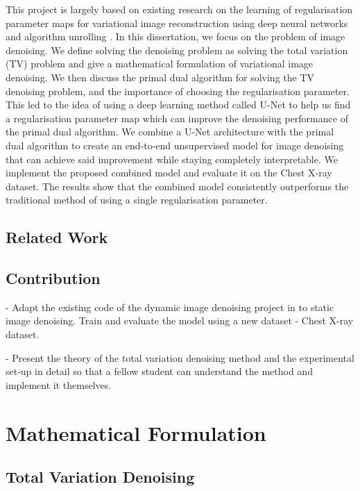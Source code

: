 \documentclass[12pt]{article}
\begin{document}
This project is largely based on existing research 
on the learning of 
regularisation parameter maps for variational image reconstruction using deep neural networks and algorithm unrolling \cite{kofler2023learning}.
In this dissertation, we 
focus on the problem of image denoising.
We define solving the denoising problem as solving the total variation (TV) problem and give a mathematical formulation of variational image denoising. 
We then discuss the primal dual algorithm for solving the TV denoising problem, and the importance of choosing the regularisation parameter.
This led to the idea of using a deep learning method called U-Net to help us find a regularisation parameter map which can improve the denoising performance of the primal dual algorithm.
We combine a U-Net architecture with the primal dual algorithm to create an end-to-end unsupervised model for image denoising that can achieve said improvement while staying completely interpretable. 
We implement the proposed combined model and evaluate it on the Chest X-ray dataset.
The results show that the combined model consistently outperforms the traditional method of using a single regularisation parameter.


\subsection{Related Work}


\subsection{Contribution}

- Adapt the existing code of the dynamic image denoising project in \cite{kofler2023learning} to static image denoising. Train and evaluate the model using a new dataset - Chest X-ray dataset.

- Present the theory of the total variation denoising method and the experimental set-up in detail so that a fellow student can understand the method and implement it themselves.


\section{Mathematical Formulation}


\subsection{Total Variation Denoising}
\end{document}
